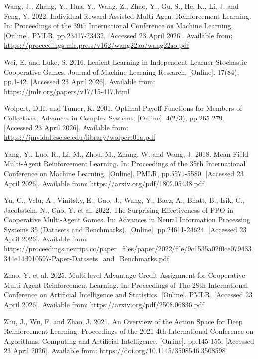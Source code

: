 Wang, J., Zhang, Y., Hua, Y., Wang, Z., Zhao, Y., Gu, S., He, K., Li, J. and Feng, Y. 2022. Individual Reward Assisted Multi-Agent Reinforcement Learning. In: Proceedings of the 39th International Conference on Machine Learning. [Online]. PMLR, pp.23417-23432. [Accessed 23 April 2026]. Available from: \url{https://proceedings.mlr.press/v162/wang22ao/wang22ao.pdf}

Wei, E. and Luke, S. 2016. Lenient Learning in Independent-Learner Stochastic Cooperative Games. Journal of Machine Learning Research. [Online]. 17(84), pp.1-42. [Accessed 23 April 2026]. Available from: \url{https://jmlr.org/papers/v17/15-417.html}

Wolpert, D.H. and Tumer, K. 2001. Optimal Payoff Functions for Members of Collectives. Advances in Complex Systems. [Online]. 4(2/3), pp.265-279. [Accessed 23 April 2026]. Available from: \url{https://jmvidal.cse.sc.edu/library/wolpert01a.pdf}

Yang, Y., Luo, R., Li, M., Zhou, M., Zhang, W. and Wang, J. 2018. Mean Field Multi-Agent Reinforcement Learning. In: Proceedings of the 35th International Conference on Machine Learning. [Online]. PMLR, pp.5571-5580. [Accessed 23 April 2026]. Available from: \url{https://arxiv.org/pdf/1802.05438.pdf}

Yu, C., Velu, A., Vinitsky, E., Gao, J., Wang, Y., Baez, A., Bhatt, B., Isik, C., Jacobstein, N., Gao, Y. et al. 2022. The Surprising Effectiveness of {PPO} in Cooperative Multi-Agent Games. In: Advances in Neural Information Processing Systems 35 (Datasets and Benchmarks). [Online]. pp.24611-24624. [Accessed 23 April 2026]. Available from: \url{https://proceedings.neurips.cc/paper_files/paper/2022/file/9c1535a02f0ce079433344e14d910597-Paper-Datasets_and_Benchmarks.pdf}

Zhao, Y. et al. 2025. Multi-level Advantage Credit Assignment for Cooperative Multi-Agent Reinforcement Learning. In: Proceedings of The 28th International Conference on Artificial Intelligence and Statistics. [Online]. PMLR, [Accessed 23 April 2026]. Available from: \url{https://arxiv.org/pdf/2508.06836.pdf}

Zhu, J., Wu, F. and Zhao, J. 2021. An Overview of the Action Space for Deep Reinforcement Learning. Proceedings of the 2021 4th International Conference on Algorithms, Computing and Artificial Intelligence. [Online]. pp.145-155. [Accessed 23 April 2026]. Available from: \url{https://doi.org/10.1145/3508546.3508598}

\endgroup
